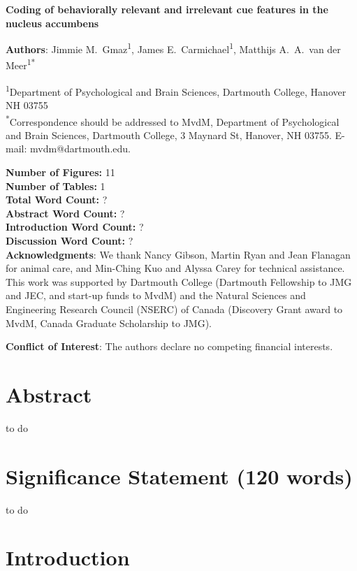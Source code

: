 \documentclass[11pt]{article}
\begin{document}
{\Large\bf Coding of behaviorally relevant and irrelevant cue features in the nucleus accumbens}

{\bf Authors}: Jimmie M.\ Gmaz\textsuperscript{1}, James
E.\ Carmichael\textsuperscript{1}, Matthijs A.\ A.\ van der
Meer\textsuperscript{1*}

\textsuperscript{1}Department of Psychological and Brain Sciences,
Dartmouth College, Hanover NH
03755\\ 

\textsuperscript{*}Correspondence should be addressed to MvdM,
Department of Psychological and Brain Sciences, Dartmouth College, 3
Maynard St, Hanover, NH 03755. E-mail: {\sffamily mvdm@dartmouth.edu}.

\textbf{Number of Figures:} 11\\
\textbf{Number of Tables:} 1\\
\textbf{Total Word Count:} ?\\
\textbf{Abstract Word Count:} ?\\
\textbf{Introduction Word Count:} ?\\
\textbf{Discussion Word Count:} ?\\

\textbf{Acknowledgments}: We thank Nancy Gibson, Martin Ryan and Jean
Flanagan for animal care, and Min-Ching Kuo and
Alyssa Carey for technical assistance. This work was supported by
Dartmouth College (Dartmouth Fellowship to JMG and JEC, and start-up funds to
MvdM) and the Natural Sciences and Engineering Research Council
(NSERC) of Canada (Discovery Grant award to MvdM, Canada Graduate
Scholarship to JMG).

\textbf{Conflict of Interest}: The authors declare no competing
financial interests.\\

\newpage
\linenumbers

\section*{Abstract}

to do

\section*{Significance Statement (120 words)}

to do

\newpage

\section*{Introduction}
\end{document}
